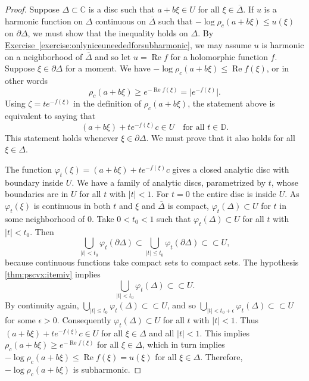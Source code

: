 \documentclass[12pt,openany]{book}
\renewcommand{\Re}{\operatorname{Re}}
\newcommand{\sabs}[1]{\lvert {#1} \rvert}
\newcommand{\babs}[1]{\bigl\lvert {#1} \bigr\rvert}
\newcommand{\C}{{\mathbb{C}}}
\newcommand{\D}{{\mathbb{D}}}
\theoremstyle{plain}
\theoremstyle{remark}
\theoremstyle{definition}
\theoremstyle{exercise}
\theoremstyle{example}
\newcommand{\exerciseref}[1]{\hyperref[#1]{Exercise~\ref*{#1}}}
\begin{document}
\begin{proof}
Suppose $\Delta \subset \C$ is a disc such that
$a+b\xi \in U$
for all $\xi \in
\overline{\Delta}$.
If $u$ is a harmonic function on $\Delta$ continuous on $\overline{\Delta}$
such that
$- \log \rho_c(a+b\xi) \leq u(\xi)$ on $\partial \Delta$, we must
show that the inequality holds on $\Delta$.
By \exerciseref{exercise:onlyniceuneededforsubharmonic},
we may assume $u$ is harmonic on a neighborhood of $\overline{\Delta}$
and so let $u = \Re f$ for a holomorphic function $f$.
Suppose $\xi \in \partial \Delta$ for a moment.
We have  $- \log \rho_c(a+b\xi) \leq \Re
f(\xi)$,
or in other words
\begin{equation*}
\rho_c(a+b\xi) \geq e^{-\Re f(\xi)} = \babs{e^{-f(\xi)}}.
\end{equation*}
Using $\zeta = t e^{-f(\xi)}$ in the definition of $\rho_c(a+b\xi)$, the
statement above is equivalent
to saying that
\begin{equation*}
(a+b\xi)+te^{-f(\xi)}c \in U \quad \text{for all $t \in \D$}.
\end{equation*}
This statement holds whenever $\xi \in \partial \Delta$.  We must prove that
it also holds for all $\xi \in \Delta$.

The function $\varphi_t(\xi) =
(a+b\xi)+te^{-f(\xi)}c$ gives a closed analytic disc with boundary inside
$U$.  We have a family of analytic discs, parametrized by $t$, whose boundaries are in
$U$ for all $t$ with $\sabs{t} < 1$.  For $t=0$ the entire disc is
inside $U$.  As $\varphi_t(\xi)$ is continuous in both $t$ and $\xi$ and
$\overline{\Delta}$ is compact,
$\varphi_t(\Delta) \subset U$ for $t$ in some neighborhood of $0$.
Take $0 < t_0 < 1$ such that
$\varphi_t(\Delta) \subset U$ for all $t$ with $\sabs{t} < t_0$.
Then
\begin{equation*}
\bigcup_{\sabs{t} < t_0} \varphi_t(\partial \Delta)
\subset
\bigcup_{\sabs{t} \leq t_0} \varphi_t(\partial \Delta)
\subset \subset U ,
\end{equation*}
because continuous functions take compact sets to compact sets.
The hypothesis \ref{thm:pscvx:itemiv} implies
\begin{equation*}
\bigcup_{\sabs{t} < t_0} \varphi_t(\Delta)
\subset \subset U  .
\end{equation*}
By continuity again,
$\bigcup_{\sabs{t} \leq t_0} \varphi_t(\Delta)
\subset \subset U$, and so
$\bigcup_{\sabs{t} < t_0+\epsilon} \varphi_t(\Delta)
\subset \subset U$
for some $\epsilon > 0$.
Consequently $\varphi_t(\Delta) \subset U$
for all $t$ with $\sabs{t} < 1$.  Thus
$(a+b\xi)+te^{-f(\xi)}c \in U$ for all $\xi \in \Delta$ and all $\sabs{t} <
1$.  This implies $\rho_c(a+b\xi) \geq e^{-\Re f(\xi)}$ for all $\xi \in
\Delta$, which in
turn implies $-\log \rho_c(a+b\xi) \leq \Re f(\xi) = u(\xi)$ for all $\xi
\in \Delta$.
Therefore, $-\log \rho_c(a+b\xi)$ is subharmonic.
\end{proof}
\end{document}
